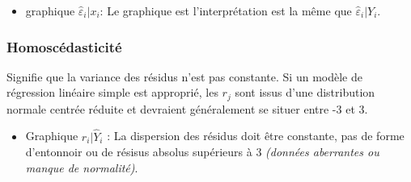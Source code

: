 \documentclass[10pt, french]{article}
\begin{document}
\begin{multicols*}{3}
\begin{itemize}

\item graphique $\hat{\varepsilon}_i | x_i$: Le graphique est l'interprétation est la même que $\hat{\varepsilon}_i | Y_i$.
\end{itemize}


\subsubsection*{Homoscédasticité}
Signifie que la variance des résidus n'est pas constante.
Si un modèle de régression linéaire simple est approprié, les $r_{j}$ sont issus d'une distribution normale centrée réduite et devraient généralement se situer entre -3 et 3.
\begin{itemize}
\item Graphique $r_i | \hat{Y}_i$ : La dispersion des résidus doit être constante, pas de forme d'entonnoir ou de résisus absolus supérieurs à 3 \textit{(données aberrantes ou manque de normalité)}.





\end{itemize}
\end{multicols*}
\end{document}
